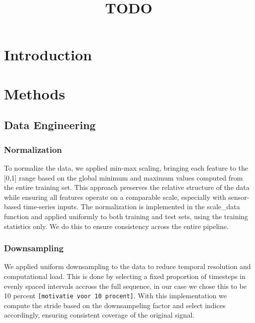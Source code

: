 \documentclass[conference]{IEEEtran}
\begin{document}
\title{TODO}

\author{
}

\maketitle

\begin{abstract}
\end{abstract}

\section{Introduction}

\section{Methods}

\subsection{Data Engineering}

\subsubsection{Normalization}
To normalize the data, we applied min-max scaling, bringing each feature to the [0,1] range based on the global minimum and maximum values computed from the entire training set. This approach preserves the relative structure of the data while ensuring all features operate on a comparable scale, especially with sensor-based time-series inputs. The normalization is implemented in the scale_data function and applied uniformly to both training and test sets, using the training statistics only. We do this to ensure consistency across the entire pipeline.

\subsubsection{Downsampling}
We applied uniform downsampling to the data to reduce temporal resolution and computational load. This is done by selecting a fixed proportion of timesteps in evenly spaced intervals accross the full sequence, in our case we chose this to be 10 percent \texttt{[motivatie voor 10 procent]}. With this implementation we compute the stride based on the downsampeling factor and select indices accordingly, ensuring consistent coverage of the original signal. 
\end{document}
